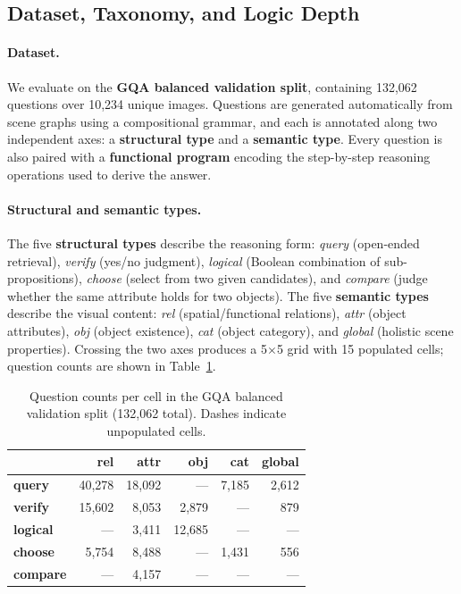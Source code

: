 \documentclass[11pt]{article}
\begin{document}
\subsection{Dataset, Taxonomy, and Logic Depth}

\paragraph{Dataset.}
We evaluate on the \textbf{GQA balanced validation split}, containing 132,062 questions over 10,234 unique images. Questions are generated automatically from scene graphs using a compositional grammar, and each is annotated along two independent axes: a \textbf{structural type} and a \textbf{semantic type}. Every question is also paired with a \textbf{functional program} encoding the step-by-step reasoning operations used to derive the answer.

\paragraph{Structural and semantic types.}
The five \textbf{structural types} describe the reasoning form: \textit{query} (open-ended retrieval), \textit{verify} (yes/no judgment), \textit{logical} (Boolean combination of sub-propositions), \textit{choose} (select from two given candidates), and \textit{compare} (judge whether the same attribute holds for two objects). The five \textbf{semantic types} describe the visual content: \textit{rel} (spatial/functional relations), \textit{attr} (object attributes), \textit{obj} (object existence), \textit{cat} (object category), and \textit{global} (holistic scene properties). Crossing the two axes produces a 5$\times$5 grid with 15 populated cells; question counts are shown in Table~\ref{tab:matrix}.

\begin{table}[h]
\centering
\small
\begin{tabular}{lrrrrr}
\toprule
 & \textbf{rel} & \textbf{attr} & \textbf{obj} & \textbf{cat} & \textbf{global} \\
\midrule
\textbf{query}   & 40,278 & 18,092 & ---    & 7,185 & 2,612 \\
\textbf{verify}  & 15,602 &  8,053 & 2,879  & ---   &   879 \\
\textbf{logical} &    --- &  3,411 & 12,685 & ---   &   --- \\
\textbf{choose}  &  5,754 &  8,488 & ---    & 1,431 &   556 \\
\textbf{compare} &    --- &  4,157 & ---    & ---   &   --- \\
\bottomrule
\end{tabular}
\caption{Question counts per cell in the GQA balanced validation split (132,062 total). Dashes indicate unpopulated cells.}
\label{tab:matrix}
\end{table}
\end{document}
